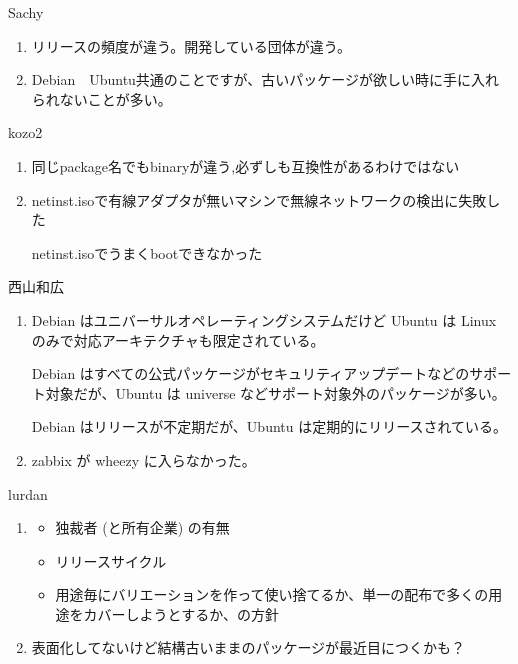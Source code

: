 \documentclass[mingoth,a4paper]{jsarticle}
\begin{document}
\begin{prework}{ Sachy }
  \begin{enumerate}
  \item リリースの頻度が違う。開発している団体が違う。
  \item Debian　Ubuntu共通のことですが、古いパッケージが欲しい時に手に入れられないことが多い。
  \end{enumerate}
\end{prework}

\clearpage

\begin{prework}{ kozo2 }
  \begin{enumerate}
  \item 同じpackage名でもbinaryが違う,必ずしも互換性があるわけではない
  \item netinst.isoで有線アダプタが無いマシンで無線ネットワークの検出に失敗した

    netinst.isoでうまくbootできなかった
  \end{enumerate}
\end{prework}

\begin{prework}{ 西山和広 }
  \begin{enumerate}
  \item Debian はユニバーサルオペレーティングシステムだけど Ubuntu は Linux のみで対応アーキテクチャも限定されている。

    Debian はすべての公式パッケージがセキュリティアップデートなどのサポート対象だが、Ubuntu は universe などサポート対象外のパッケージが多い。

    Debian はリリースが不定期だが、Ubuntu は定期的にリリースされている。
  \item zabbix が wheezy に入らなかった。
  \end{enumerate}
\end{prework}

\begin{prework}{ lurdan }
  \begin{enumerate}
  \item
    \begin{itemize}
    \item 独裁者 (と所有企業) の有無
    \item リリースサイクル
    \item 用途毎にバリエーションを作って使い捨てるか、単一の配布で多くの用途をカバーしようとするか、の方針
    \end{itemize}
  \item 表面化してないけど結構古いままのパッケージが最近目につくかも？
  \end{enumerate}
\end{prework}
\end{document}
